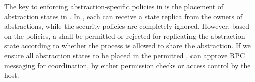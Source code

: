 
The key to enforcing abstraction-specific policies in \liboses{}
is the placement of abstraction states
in \picoprocs{}.
In \graphene{}, each \picoproc{} can receive a state replica
from the owners of abstractions,
while the security policies are completely ignored.
However, based on the policies,
a \picoproc{} shall be permitted or rejected for
replicating the abstraction state according to whether the process is allowed to share the abstraction.
If we ensure all abstraction states to be placed in the permitted \picoprocs{},
\liboses{} can approve RPC messaging for coordination,
by either permission checks
or access control by the host.

